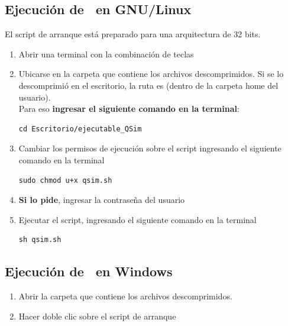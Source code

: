 \documentclass[11pt,a4paper]{article}
\newcommand{\lnx}{GNU/Linux}
\begin{document}
\subsection{Ejecución de \qsim\ en \lnx}

El script de arranque  está preparado para una arquitectura de 32 bits. 

\begin{enumerate}
\item Abrir una terminal con la combinación de teclas 
\item Ubicarse en la carpeta que contiene los archivos descomprimidos. Si se lo descomprimió en el escritorio, la ruta es  (dentro de la carpeta home del usuario). \\Para eso \textbf{ingresar el siguiente comando en la terminal}:
\begin{verbatim}
cd Escritorio/ejecutable_QSim
\end{verbatim}
\item Cambiar los permisos de ejecución sobre el script ingresando el siguiente comando en la terminal
\begin{verbatim}
sudo chmod u+x qsim.sh
\end{verbatim}
\item \textbf{Si lo pide}, ingresar la contraseña del usuario
\item Ejecutar el script, ingresando el siguiente comando en la terminal
\begin{verbatim}
sh qsim.sh
\end{verbatim}
\end{enumerate}

\subsection{Ejecución de \qsim\ en Windows}

 
\begin{enumerate}
\item Abrir la carpeta que contiene los archivos descomprimidos.
\item Hacer doble clic sobre el script de arranque 
\end{enumerate}


\end{document}
